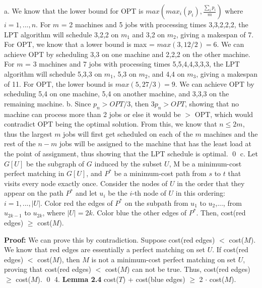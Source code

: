 \documentclass[oneside]{homework} %
\begin{document}
{\large a.} We know that the lower bound for OPT is $max(max_i(p_i), \frac{\sum\limits_{i}p_i}{m})$ where $i = 1,...,n$. 
\newline
\newline
For $m$ = 2 machines and 5 jobs with processing times 3,3,2,2,2, the LPT algorithm will schedule 3,2,2 on $m_1$ and 3,2 on $m_2$, giving a makespan of 7. For OPT, we know that a lower bound is max = $max(3, 12/2) = 6$. We can achieve OPT by scheduling 3,3 on one machine and 2,2,2 on the other machine.
\newline
\newline
For $m$ = 3 machines and 7 jobs with processing times 5,5,4,4,3,3,3, the LPT algorithm will schedule 5,3,3 on $m_1$, 5,3 on $m_2$, and 4,4 on $m_3$, giving a makespan of 11. For OPT, the lower bound is $max(5, 27/3) = 9$. We can achieve OPT by scheduling 5,4 on one machine, 5,4 on another machine, and 3,3,3 on the remaining machine.
\newline
\newline
{\large b.} Since $p_n > OPT/3$, then $3p_n > OPT$, showing that no machine can process more than 2 jobs or else it would be $>$ OPT, which would contradict OPT being the optimal solution. From this, we know that $n \leq 2m$, thus the largest $m$ jobs will first get scheduled on each of the $m$ machines and the rest of the $n - m$ jobs will be assigned to the machine that has the least load at the point of assignment, thus showing that the LPT schedule is optimal. \hfill\qed
\newline
\newline
{\large c.} Let $G[U]$ be the subgraph of $G$ induced by the subset $U$, M be a minimum-cost perfect matching in $G[U]$, and $P^*$ be a minimum-cost path from $s$ to $t$ that visits every node exactly once. Consider the nodes of $U$ in the order that they appear on the path $P^*$ and let $u_i$ be the $i$-th node of $U$ in this ordering: $ i=1,...,|U|$. Color red the edges of $P^*$ on the subpath from $u_1$ to $u_2$,..., from $u_{2k-1}$ to $u_{2k}$, where $|U|=2k$. Color blue the other edges of $P^*$. Then, cost(red edges) $\geq$ cost($M$).
\newline

\textbf{Proof:} We can prove this by contradiction. Suppose cost(red edges) $<$ cost($M$). We know that red edges are essentially a perfect matching on set $U$. If cost(red edges) $<$ cost($M$), then $M$ is not a minimum-cost perfect matching on set $U$, proving that cost(red edges) $<$ cost($M$) can not be true. Thus, cost(red edges) $\geq$ cost($M$). \hfill\qed
\newline
\newline
{\large4.} \textbf{Lemma 2.4} cost($T$) + cost(blue edges) $\geq$ 2 $\cdot$ cost($M$).
\newline
\end{document}
